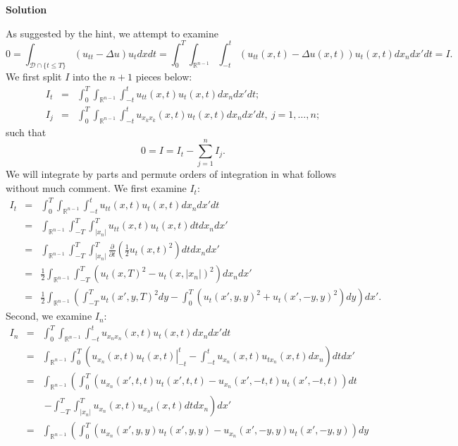 \documentclass{article}
\begin{document}
\begin{enumerate}
{\bf Solution}

As suggested by the hint, we attempt to examine
\[0 = \int_{\mathcal{D} \cap \{t \leq T\}} \left( u_{tt} - \Delta u \right) u_t dx dt
    = \int_0^T \int_{\mathbb{R}^{n - 1}} \int_{-t}^t \left( u_{tt}(x,t) - \Delta u (x,t) \right) u_t(x,t) dx_n dx' dt
    = I.\]
We first split \(I\) into the \(n + 1\) pieces below:
\begin{eqnarray*}
I_t & = & \int_0^T \int_{\mathbb{R}^{n - 1}} \int_{-t}^t u_{tt}(x,t) u_t(x,t) dx_n dx' dt; \\
I_j & = & \int_0^T \int_{\mathbb{R}^{n - 1}} \int_{-t}^t u_{x_kx_k}(x,t) u_t(x,t) dx_n dx' dt, \ j = 1, \ldots, n;
\end{eqnarray*}
such that
\[0 = I = I_t - \sum_{j = 1}^n I_j.\]
We will integrate by parts and permute orders of integration in what follows without much comment.  We first examine \(I_t\):
\begin{eqnarray*}
I_t
& = & \int_0^T \int_{\mathbb{R}^{n - 1}} \int_{-t}^t u_{tt}(x,t) u_t(x,t) dx_n dx' dt \\
& = & \int_{\mathbb{R}^{n - 1}} \int_{-T}^T \int_{|x_n|}^T u_{tt}(x,t) u_t(x,t) dt dx_n dx' \\
& = & \int_{\mathbb{R}^{n - 1}} \int_{-T}^T \int_{|x_n|}^T \frac{\partial}{\partial t} \left( \frac{1}{2} u_t(x,t)^2 \right) dt dx_n dx' \\
& = & \frac{1}{2} \int_{\mathbb{R}^{n - 1}} \int_{-T}^T \left( u_t(x,T)^2 - u_t(x,|x_n|)^2 \right) dx_n dx' \\
& = & \frac{1}{2} \int_{\mathbb{R}^{n - 1}} \left( \int_{-T}^T u_t(x',y,T)^2 dy - \int_0^T \left( u_t(x',y,y)^2 + u_t(x',-y,y)^2 \right) dy \right) dx'.
\end{eqnarray*}
Second, we examine \(I_n\):
\begin{eqnarray*}
I_n
& = & \int_0^T \int_{\mathbb{R}^{n - 1}} \int_{-t}^t u_{x_nx_n}(x,t) u_t(x,t) dx_n dx' dt \\
& = & \int_{\mathbb{R}^{n - 1}} \int_0^T \left( \left. u_{x_n}(x,t) u_t(x,t) \right|_{-t}^t - \int_{-t}^t u_{x_n}(x,t) u_{tx_n}(x,t) dx_n \right) dt dx' \\
& = & \int_{\mathbb{R}^{n - 1}} \left( \int_0^T \left( u_{x_n}(x',t,t) u_t(x',t,t) - u_{x_n}(x',-t,t) u_t(x',-t,t) \right) dt \right. \\
&   & \ \left. - \int_{-T}^T \int_{|x_n|}^T u_{x_n}(x,t) u_{x_nt}(x,t) dt dx_n \right) dx' \\
& = & \int_{\mathbb{R}^{n - 1}} \left( \int_0^T \left( u_{x_n}(x',y,y) u_t(x',y,y) - u_{x_n}(x',-y,y) u_t(x',-y,y) \right) dy \right. \\

\end{eqnarray*}
\end{enumerate}
\end{document}
